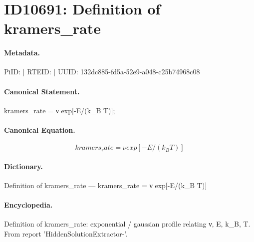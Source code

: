 \section*{ID10691: Definition of kramers\_rate}
\paragraph{Metadata.}
PiID:  | RTEID:  | UUID: 132dc885-fd5a-52e9-a048-c25b74968c08

\paragraph{Canonical Statement.}
kramers\_rate = ν exp[-E/(k\_B T)];

\paragraph{Canonical Equation.}
\[
kramers_rate = ν  exp[-E/(k_B  T)]
\]

\paragraph{Dictionary.}
Definition of kramers\_rate — kramers\_rate = ν  exp[-E/(k\_B  T)]

\paragraph{Encyclopedia.}
Definition of kramers\_rate: exponential / gaussian profile relating ν, E, k\_B, T. From report 'HiddenSolutionExtractor-'.
